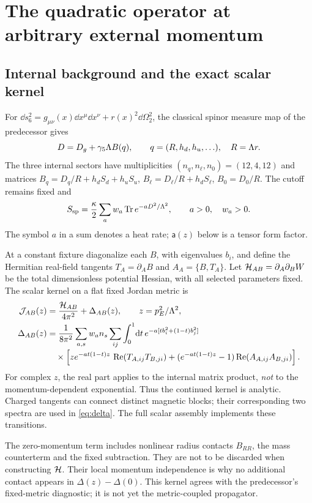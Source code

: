 \section{The quadratic operator at arbitrary external momentum}

\subsection{Internal background and the exact scalar kernel}

For $\dd s_6^2=g_{\mu\nu}(x)\dd x^\mu\dd x^\nu+r(x)^2\dd\Omega_2^2$, the classical spinor measure map of the predecessor gives
\begin{equation}
 D=D_g+\gamma_5\Lambda B(q),\qquad q=(R,h_d,h_u,\ldots),\quad R=\Lambda r.
\end{equation}
The three internal sectors have multiplicities $(n_q,n_\ell,n_0)=(12,4,12)$ and matrices $B_q=D_q/R+h_dS_d+h_uS_u$, $B_\ell=D_\ell/R+h_dS_\ell$, $B_0=D_0/R$. The cutoff remains fixed and
\begin{equation}
 S_{\rm sp}=\frac\kappa2\sum_a w_a\operatorname{Tr} e^{-aD^2/\Lambda^2},\qquad a>0,\quad w_a>0.
\end{equation}
The symbol $a$ in a sum denotes a heat rate; $\mathsf a(z)$ below is a tensor form factor.

At a constant fixture diagonalize each $B$, with eigenvalues $b_i$, and define the Hermitian real-field tangents $T_A=\partial_A B$ and $A_A=\{B,T_A\}$. Let $\mathcal H_{AB}=\partial_A\partial_B W$ be the total dimensionless potential Hessian, with all selected parameters fixed. The scalar kernel on a flat fixed Jordan metric is
\begin{align}
 \mathcal J_{AB}(z)&=\frac{\mathcal H_{AB}}{4\pi^2}+\Delta_{AB}(z),\qquad z=p_E^2/\Lambda^2,\label{eq:J}\\
 \Delta_{AB}(z)&=\frac1{8\pi^2}\sum_{a,s}w_an_s\sum_{ij}\int_0^1\!\mathrm d t\,
 e^{-a[tb_i^2+(1-t)b_j^2]}\nonumber\\[-2pt]
 &\quad\times\left[z e^{-at(1-t)z}\,\operatorname{Re}(T_{A,ij}T_{B,ji})
 +(e^{-at(1-t)z}-1)\operatorname{Re}(A_{A,ij}A_{B,ji})\right].\label{eq:delta}
\end{align}
For complex $z$, the real part applies to the internal matrix product, \emph{not} to the momentum-dependent exponential. Thus the continued kernel is analytic. Charged tangents can connect distinct magnetic blocks; their corresponding two spectra are used in \eqref{eq:delta}. The full scalar assembly implements these transitions.

The zero-momentum term includes nonlinear radius contacts $B_{RR}$, the mass counterterm and the fixed subtraction. They are not to be discarded when constructing $\mathcal H$. Their local momentum independence is why no additional contact appears in $\Delta(z)-\Delta(0)$. This kernel agrees with the predecessor's fixed-metric diagnostic; it is not yet the metric-coupled propagator.

